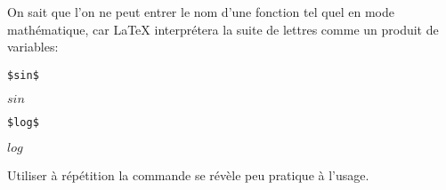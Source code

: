On sait que l'on ne peut entrer le nom d'une fonction tel quel en mode
mathématique, car {\LaTeX} interprétera la suite de lettres comme un
produit de variables:
\begin{demo}
\item
  \begin{texinput}{0.2\linewidth}
\begin{lstlisting}
$sin$
\end{lstlisting}
  \end{texinput}
  \quad
  \begin{texoutput}{0.2\linewidth}
    $sin$
  \end{texoutput}
  \hfill
  \begin{texinput}{0.2\linewidth}
\begin{lstlisting}
$log$
\end{lstlisting}
  \end{texinput}
  \quad
  \begin{texoutput}{0.2\linewidth}
    $log$
  \end{texoutput}
\end{demo}
Utiliser à répétition la commande  se révèle peu
pratique à l'usage.

